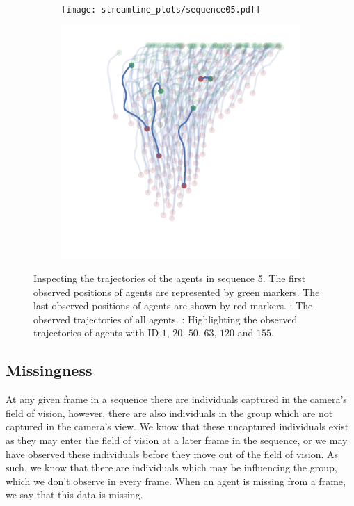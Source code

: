 \begin{figure}[!tbp]
	\begin{subfigure}[b]{0.5\textwidth}
		\centering
		\texttt{[image: streamline\_plots/sequence05.pdf]}
		\caption{}
		\label{subfig:seq05_traj_no_highlight}
	\end{subfigure}%
	\begin{subfigure}[b]{0.5\textwidth}
		\centering
		\includegraphics{streamline_plots/sequence05_highlight.pdf}
		\caption{}
		\label{subfig:seq05_traj_highlight}
	\end{subfigure}
	\caption{Inspecting the trajectories of the agents in sequence 5. The first observed positions of agents are represented by green markers. The last observed positions of agents are shown by red markers. : The observed trajectories of all agents. : Highlighting the observed trajectories of agents with ID $1$, $20$, $50$, $63$, $120$ and $155$.}
	\label{fig:seq05_traj}
\end{figure}

\subsection{Missingness}
\label{ssec:missingness}

At any given frame in a sequence there are individuals captured in the camera's field of vision, however, there are also individuals in the group which are not captured in the camera's view. We know that these uncaptured individuals exist as they may enter the field of vision at a later frame in the sequence, or we may have observed these individuals before they move out of the field of vision. As such, we know that there are individuals which may be influencing the group, which we don't observe in every frame. When an agent is missing from a frame, we say that this data is missing.

